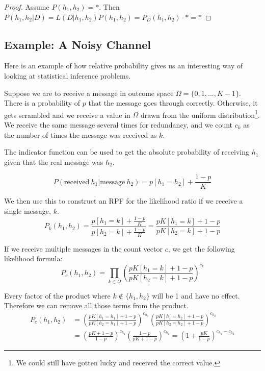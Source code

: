 \documentclass[twoside]{article}
\theoremstyle{plain}%
\theoremstyle{definition}
\theoremstyle{remark}
\begin{document}
\begin{proof}
Assume \(P(h_1, h_2) = \ast\). Then \(P(h_1, h_2|D) = L(D|h_1, h_2) P(h_1, h_2) = P_D(h_1, h_2) \cdot \ast = \ast\)
\end{proof}

\subsection{Example: A Noisy Channel}

Here is an example of how relative probability gives us an interesting way of looking at statistical inference problems.

Suppose we are to receive a message in outcome space \(\Omega = \{0, 1, ..., K-1\}\). There is a probability of \(p\) that the message goes through correctly. Otherwise, it gets scrambled and we receive a value in \(\Omega\) drawn from the uniform distribution\footnote{We could still have gotten lucky and received the correct value.}. We receive the same message several times for redundancy, and we count \(c_k\) as the number of times the message was received as \(k\).

The indicator function can be used to get the absolute probability of receiving \(h_1\) given that the real message was \(h_2\).

\[P(\text{received}\: h_1 | \text{message}\: h_2) = p[h_1 = h_2] + \frac{1-p}{K}\]
 
We then use this to construct an RPF for the likelihood ratio if we receive a single message, \(k\).
\[P_k(h_1, h_2) = \frac{p[h_1 = k] + \frac{1-p}{K}}{p[h_2 = k] + \frac{1-p}{K}} = \frac{pK[h_1 = k] + 1-p}{pK[h_2 = k] + 1-p}\]

If we receive multiple messages in the count vector \(c\), we get the following likelihood formula:
\[P_c(h_1, h_2) = \prod_{k \in \Omega}\left(\frac{pK[h_1 = k] + 1-p}{pK[h_2 = k] + 1-p}\right)^{c_k}\]

Every factor of the product where \(k \notin \{h_1, h_2\}\) will be 1 and have no effect. Therefore we can remove all those terms from the product.
\begin{equation}
\begin{aligned}
P_c(h_1, h_2) &= \left(\frac{pK[h_1 = h_1] + 1-p}{pK[h_2 = h_1] + 1-p}\right)^{c_{h_1}} \left(\frac{pK[h_1 = h_2] + 1-p}{pK[h_2 = h_2] + 1-p}\right)^{c_{h_2}} \\
& = \left(\frac{pK + 1-p}{1-p}\right)^{c_{h_1}} \left(\frac{1-p}{pK + 1-p}\right)^{c_{h_2}} = \left(1 + \frac{pK}{1-p}\right)^{c_{h_1} - c_{h_2}}
\end{aligned}
\end{equation}
\end{document}

